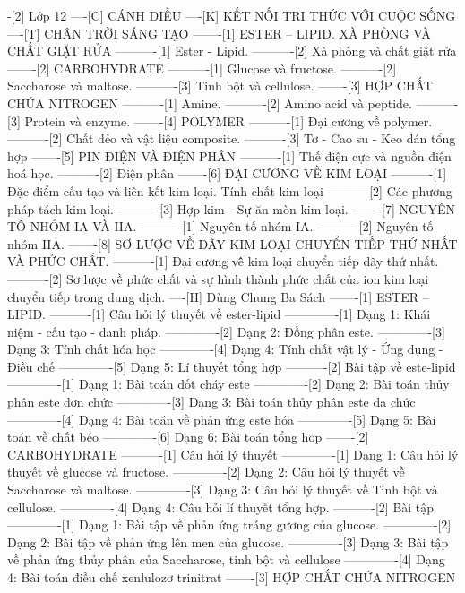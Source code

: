 -[2] Lớp 12
----[C] CÁNH DIỀU
----[K] KẾT NỐI TRI THỨC VỚI CUỘC SỐNG
----[T] CHÂN TRỜI SÁNG TẠO
-------[1] ESTER – LIPID. XÀ PHÒNG VÀ CHẤT GIẶT RỬA
----------[1] Ester - Lipid.
----------[2] Xà phòng và chất giặt rửa
-------[2] CARBOHYDRATE
----------[1] Glucose và fructose.
----------[2] Saccharose và maltose.
----------[3] Tinh bột và cellulose.
-------[3] HỢP CHẤT CHỨA NITROGEN
----------[1] Amine.
----------[2] Amino acid và peptide.
----------[3] Protein và enzyme.
-------[4] POLYMER
----------[1] Đại cương về polymer.
----------[2] Chất dẻo và vật liệu composite.
----------[3] Tơ - Cao su - Keo dán tổng hợp
-------[5] PIN ĐIỆN VÀ ĐIỆN PHÂN
----------[1] Thế điện cực và nguồn điện hoá học. 
----------[2] Điện phân
-------[6] ĐẠI CƯƠNG VỀ KIM LOẠI
----------[1] Đặc điểm cấu tạo và liên kết kim loại. Tính chất kim loại
----------[2] Các phương pháp tách kim loại.
----------[3] Hợp kim - Sự ăn mòn kim loại.
-------[7] NGUYÊN TỐ NHÓM IA VÀ IIA.
----------[1] Nguyên tố nhóm IA.
----------[2] Nguyên tố nhóm IIA.
-------[8] SƠ LƯỢC VỀ DÃY KIM LOẠI CHUYỂN TIẾP THỨ NHẤT VÀ PHỨC CHẤT.
----------[1] Đại cương vê̂ kim loại chuyển tiếp dãy thứ nhất. 
----------[2] Sơ lược về phức chất và sự hình thành phức chất của ion kim loại chuyển tiếp trong dung dịch.
----[H] Dùng Chung Ba Sách
-------[1] ESTER – LIPID.
----------[1] Câu hỏi lý thuyết về ester-lipid
-------------[1] Dạng 1: Khái niệm - cấu tạo - danh pháp.
-------------[2] Dạng 2: Đồng phân este.
-------------[3] Dạng 3: Tính chất hóa học
-------------[4] Dạng 4: Tính chất vật lý - Ứng dụng - Điều chế
-------------[5] Dạng 5: Lí thuyết tổng hợp
----------[2] Bài tập về este-lipid
-------------[1] Dạng 1: Bài toán đốt cháy este
-------------[2] Dạng 2: Bài toán thủy phân este đơn chức
-------------[3] Dạng 3: Bài toán thủy phân este đa chức
-------------[4] Dạng 4: Bài toán về phản ứng este hóa
-------------[5] Dạng 5: Bài toán về chất béo
-------------[6] Dạng 6: Bài toán tổng hơp
-------[2] CARBOHYDRATE
----------[1] Câu hỏi lý thuyết 
-------------[1] Dạng 1: Câu hỏi lý thuyết về glucose và fructose.
-------------[2] Dạng 2: Câu hỏi lý thuyết về Saccharose và maltose.
-------------[3] Dạng 3: Câu hỏi lý thuyết về Tinh bột và cellulose.
-------------[4] Dạng 4: Câu hỏi lí thuyết tổng hợp.
----------[2] Bài tập 
-------------[1] Dạng 1: Bài tập về phản ứng tráng gương của glucose.
-------------[2] Dạng 2: Bài tập về phản ứng lên men của glucose.
-------------[3] Dạng 3: Bài tập về phản ứng thủy phân của Saccharose, tinh bột và cellulose
-------------[4] Dạng 4: Bài toán điều chế xenlulozơ trinitrat
-------[3] HỢP CHẤT CHỨA NITROGEN
